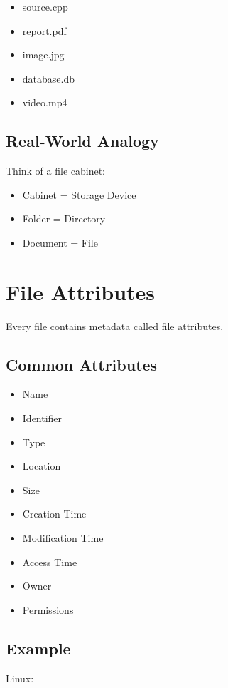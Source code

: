 \begin{itemize}
\item source.cpp
\item report.pdf
\item image.jpg
\item database.db
\item video.mp4
\end{itemize}

\subsection{Real-World Analogy}

Think of a file cabinet:

\begin{itemize}
\item Cabinet = Storage Device
\item Folder = Directory
\item Document = File
\end{itemize}

\section{File Attributes}

Every file contains metadata called file attributes.

\subsection{Common Attributes}

\begin{itemize}
\item Name
\item Identifier
\item Type
\item Location
\item Size
\item Creation Time
\item Modification Time
\item Access Time
\item Owner
\item Permissions
\end{itemize}

\subsection{Example}

Linux:

